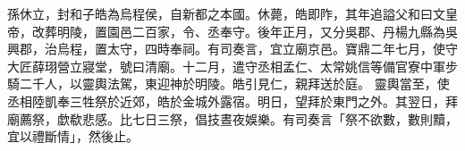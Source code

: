 \begin{pinyinscope}
 
孫休立，封和子皓為烏程侯，自新都之本國。休薨，皓即阼，其年追謚父和曰文皇帝，改葬明陵，置園邑二百家，令、丞奉守。後年正月，又分吳郡、丹楊九縣為吳興郡，治烏程，置太守，四時奉祠。有司奏言，宜立廟京邑。寶鼎二年七月，使守大匠薛珝營立寢堂，號曰清廟。十二月，遣守丞相孟仁、太常姚信等備官寮中軍步騎二千人，以靈輿法駕，東迎神於明陵。皓引見仁，親拜送於庭。
 靈輿當至，使丞相陸凱奉三牲祭於近郊，皓於金城外露宿。明日，望拜於東門之外。其翌日，拜廟薦祭，歔欷悲感。比七日三祭，倡技晝夜娛樂。有司奏言「祭不欲數，數則黷，宜以禮斷情」，然後止。
 
 
\end{pinyinscope}